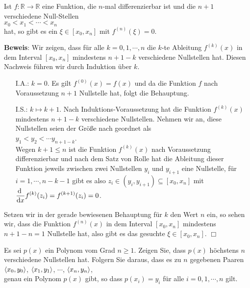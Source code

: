 \begin{Satz}
  Ist $f:\mathbb{R} \rightarrow \mathbb{R}$ eine Funktion, die $n$-mal differenzierbar
  ist und die $n+1$ verschiedene Null-Stellen 
  \\[0.2cm]
  \hspace*{1.3cm}  $x_0 < x_1 < \cdots < x_n$
  \\[0.2cm]
  hat, so gibt es ein $\xi\in[x_0,x_n]$ mit $f^{(n)}(\xi) = 0$.
\end{Satz}
\textbf{Beweis}:  Wir zeigen, dass f\"ur alle $k=0,1,\cdots,n$ die $k$-te Ableitung
$f^{(k)}(x)$ in dem Interval $[x_0,x_n]$ mindestens $n+1-k$ verschiedene Nullstellen hat.
Diesen Nachweis f\"uhren wir durch Induktion \"uber $k$.
\begin{enumerate}
\item[I.A.:] $k=0$. Es gilt $f^{(0)}(x) = f(x)$ und da die Funktion $f$ nach Voraussetzung $n+1$
             Nullstelle hat, folgt die Behauptung.
\item[I.S.:] $k\mapsto k+1$.  Nach Induktions-Voraussetzung hat die Funktion
             $f^{(k)}(x)$ mindestens $n + 1 -k$ verschiedene Nullstellen.
             Nehmen wir an, diese Nullstellen seien der Gr\"o{\ss}e nach geordnet als
             \\[0.2cm]
             \hspace*{1.3cm} $y_1 < y_2 < \cdots y_{n+1-k}$. \\[0.2cm]
             Wegen $k+1\leq n$ ist die Funktion $f^{(k)}(x)$ nach Voraussetzung
             differenzierbar und nach dem Satz von Rolle hat die Ableitung dieser Funktion
             jeweils zwischen zwei Nullstellen $y_i$ und $y_{i+1}$ eine Nullstelle, 
             f\"ur $i=1,\cdots,n-k-1$ gibt es also $z_i \in (y_i,y_{i+1}) \subseteq[x_0,x_n]$ mit 
             \\[0.2cm]
             \hspace*{1.3cm} $\displaystyle\frac{\textrm{d}\;}{\textrm{d}x} f^{(k)}(z_i) = f^{(k+1)}(z_i) = 0$.
\end{enumerate}
Setzen wir in der gerade bewiesenen Behauptung f\"ur $k$ den Wert $n$ ein, so sehen wir, dass die Funktion $f^{(n)}(x)$ in dem Interval
$[x_0,x_n]$ mindestens $n+1-n=1$ Nullstelle hat, also gibt es das gesuchte
$\xi\in[x_0,x_n]$.
\hspace*{\fill} $\Box$

\exercise
Es sei $p(x)$  ein Polynom vom Grad $n\geq 1$.  Zeigen Sie, dass
$p(x)$ h\"ochstens $n$ verschiedene Nullstellen hat.  Folgern Sie daraus, dass es zu $n$ gegebenen Paaren 
\\[0.2cm]
\hspace*{1.3cm}
$\pair(x_0,y_0)$, $\pair(x_1,y_1)$, $\cdots$, $\pair(x_n,y_n)$,
\\[0.2cm]
genau ein Polynom $p(x)$ gibt, so dass $p(x_i) = y_i$ f\"ur alle $i=0,1,\cdots,n$ gilt. \eox



